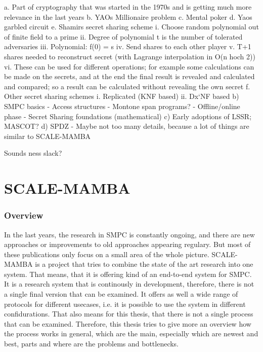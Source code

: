 \documentclass[english,runningheads,a4paper]{llncs}[2018/03/10]
\begin{document}
a.	Part of cryptography that was started in the 1970s and is getting much more relevance in the last years
b.	YAOs Millionaire problem
c.	Mental poker
d.	Yaos garbled circuit
e.	Shamirs secret sharing scheme
i.	Choose random polynomial out of finite field to a prime
ii.	Degree of polynomial t is the number of tolerated adversaries
iii.	Polynomial: f(0) = s
iv.	Send shares to each other player
v.	 T+1 shares needed to reconstruct secret (with Lagrange interpolation in O(n hoch 2))
vi.	These can be used for different operations; for example some calculations can be made on the secrets, and at the end the final result is revealed and calculated and compared; so a result can be calculated without revealing the own secret
f.	Other secret sharing schemes
i.	Replicated (KNF based)
ii.	Dx`NF based
b)	SMPC basics
-	Access structures
-	Montone span programs?
-	Offline/online phase
-	Secret Sharing foundations (mathematical)
c)	Early adoptions of LSSR; MASCOT?
d)	SPDZ
-	Maybe not too many details, because a lot of things are similar to SCALE-MAMBA


Sounds ness slack?


\section{SCALE-MAMBA}\label{sec:scalemamba}

\subsubsection{Overview}

In the last years, the research in SMPC is constantly ongoing, and there are new approaches or improvements to old approaches appearing regulary. But most of these publications only focus on a small area of the whole picture. SCALE-MAMBA is a project that tries to combine the state of the art research into one system. That means, that it is offering kind of an end-to-end system for SMPC.
It is a research system that is continously in development, therefore, there is not a single final version that can be examined. It offers as well a wide range of protocols for different usecases, i.e. it is possible to use the system in different confidurations. That also means for this thesis, that there is not a single process that can be examined. Therefore, this thesis tries to give more an overview how the process works in general, which are the main, especially which are newest and best, parts and where are the problems and bottlenecks.
 
\end{document}
